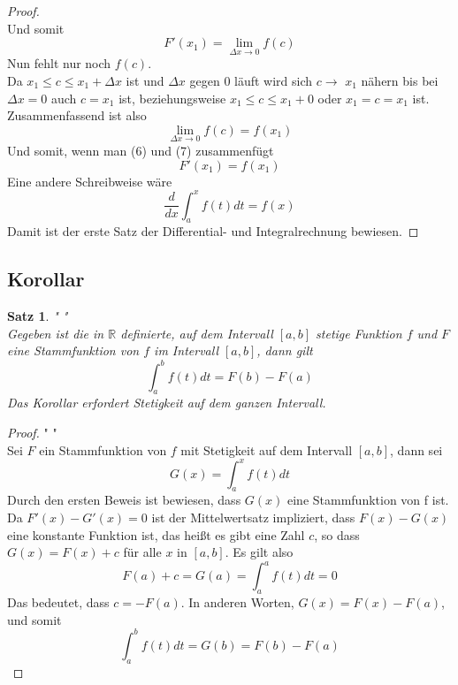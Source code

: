 \documentclass[fontsize=12pt,paper=a4,DIV12,cleardoublepage=empty, 
liststotoc,idxtotoc,bibtotoc]{article}
\newcommand{\RR}{\mathbb{R}}
\theoremstyle{plain}
\newtheorem{satz}{Satz}[subsection]
\theoremstyle{definition}
\begin{document}
\begin{proof}
\begin{equation*}
		\end{equation*}
		Und somit
		\begin{equation}
			F'(x_1)=\lim \limits_{\Delta x \to 0}f(c)
		\end{equation}
		Nun fehlt nur noch $f(c)$.\\ Da $x_1 \leq c \leq x_1+\Delta x$ ist und $\Delta x$ gegen $0$ läuft wird sich $c\to$ $x_1$ nähern bis bei $\Delta x=0$ auch $c = x_1$ ist, beziehungsweise $x_1 \leq c \leq x_1 + 0$ oder $x_1 = c = x_1$ ist.\\Zusammenfassend ist also
		\begin{equation}
			\lim \limits_{\Delta x \to 0} f(c) = f(x_1)
		\end{equation}
		Und somit, wenn man (6) und (7) zusammenfügt
		\begin{equation*}
			F'(x_1)=f(x_1)
		\end{equation*}
		Eine andere Schreibweise wäre
		\begin{equation*}
			\frac{d}{dx}\int_{a}^{x}f(t)dt=f(x)
		\end{equation*}
		Damit ist der erste Satz der Differential- und Integralrechnung bewiesen.
	\end{proof}
	
	\subsection{Korollar}
	\begin{satz}" "\\
		Gegeben ist die in $\RR$ definierte, auf dem Intervall $[a, b]$ stetige Funktion $f$  und $F$ eine Stammfunktion von $f$ im Intervall $[a, b]$, dann gilt
		\begin{equation*}
			\int_{a}^{b}f(t)dt=F(b)-F(a)
		\end{equation*}
		Das Korollar erfordert Stetigkeit auf dem ganzen Intervall.
	\end{satz}

	\begin{proof}" "\\
		Sei $F$ ein Stammfunktion von $f$ mit Stetigkeit auf dem Intervall $[a, b]$, dann sei
		\begin{equation*}
			G(x)=\int_{a}^{x}f(t)dt
		\end{equation*}
		Durch den ersten Beweis ist bewiesen, dass $G(x)$ eine Stammfunktion von f ist. Da $F'(x)-G'(x)=0$ ist der Mittelwertsatz impliziert, dass $F(x)-G(x)$ eine konstante Funktion ist, das heißt es gibt eine Zahl $c$, so dass $G(x)=F(x)+c$ für alle $x$ in $[a, b]$. Es gilt also
		\begin{equation*}
			F(a)+c=G(a)=\int_{a}^{a}f(t)dt=0
		\end{equation*}
		Das bedeutet, dass $c=-F(a)$. In anderen Worten, $G(x)=F(x)-F(a)$, und somit
		\begin{equation*}
			\int_{a}^{b}f(t)dt=G(b)=F(b)-F(a)
		\end{equation*}
	\end{proof}
		
\end{document}
